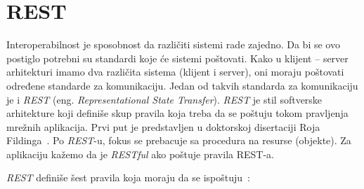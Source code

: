 \section{REST}\label{sec:arhitektura-rest}

Interoperabilnost je sposobnost da različiti sistemi rade zajedno. Da bi se ovo postiglo potrebni su 
standardi koje će sistemi poštovati. Kako u klijent -- server arhitekturi imamo dva različita sistema 
(klijent i server), oni moraju poštovati određene standarde za komunikaciju. Jedan od takvih standarda za 
komunikaciju je i \textit{REST} (eng. \textit{Representational State Transfer}). \textit{REST} je stil 
softverske arhitekture koji definiše skup pravila koja treba da se poštuju tokom pravljenja mrežnih 
aplikacija. Prvi put je predstavljen u doktorskoj disertaciji Roja Fildinga~\cite{REST_Roy}. Po \textit{REST}-u, 
fokus se prebacuje sa procedura na resurse (objekte). Za aplikaciju kažemo da je \textit{RESTful} ako poštuje pravila REST-a.


\textit{REST} definiše šest pravila koja moraju da se ispoštuju~\cite{REST_API}:

